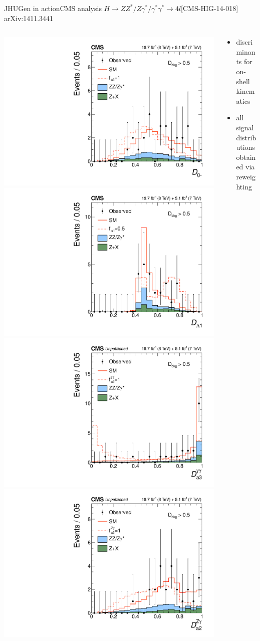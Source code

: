 \documentclass[usenames,dvipsnames,svgnames,table]{beamer}
\begin{document}
\begin{frame}{JHUGen in action}{CMS analysis $H \to ZZ^*/Z\gamma^*/\gamma^*\gamma^* \to 4l$\hfill [CMS-HIG-14-018] arXiv:1411.3441}
\begin{columns}
\begin{column}{0.6\textwidth}
\includegraphics[width=.5\columnwidth]{HVV/d0minus}
\includegraphics[width=.5\columnwidth]{HVV/dlambda1} \\
\includegraphics[width=.5\columnwidth]{HVV/Da3gammagamma}
\includegraphics[width=.5\columnwidth]{HVV/Da2Zgamma}
\end{column}
\begin{column}{0.4\textwidth}
\begin{itemize}
\item discriminants for on-shell kinematics
\item all signal distributions obtained via reweighting
\end{itemize}
\end{column}
\end{columns}
\end{frame}
\end{document}
